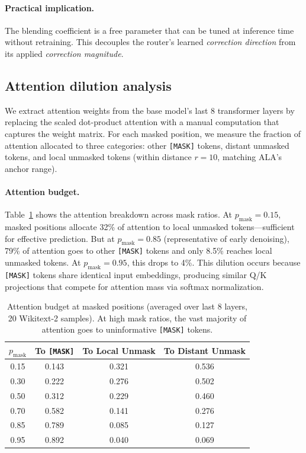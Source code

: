 \documentclass{article} %
\newcommand{\pmask}{p_{\text{mask}}}
\begin{document}
\paragraph{Practical implication.}
The blending coefficient is a free parameter that can be tuned at inference time without retraining.
This decouples the router's learned \emph{correction direction} from its applied \emph{correction magnitude}.

\subsection{Attention dilution analysis}
\label{sec:dilution}

We extract attention weights from the base model's last 8 transformer layers by replacing the scaled dot-product attention with a manual computation that captures the weight matrix.
For each masked position, we measure the fraction of attention allocated to three categories: other \texttt{[MASK]} tokens, distant unmasked tokens, and local unmasked tokens (within distance $r{=}10$, matching ALA's anchor range).

\paragraph{Attention budget.}
Table~\ref{tab:attn_budget} shows the attention breakdown across mask ratios.
At $\pmask{=}0.15$, masked positions allocate 32\% of attention to local unmasked tokens---sufficient for effective prediction.
But at $\pmask{=}0.85$ (representative of early denoising), 79\% of attention goes to other \texttt{[MASK]} tokens and only 8.5\% reaches local unmasked tokens.
At $\pmask{=}0.95$, this drops to 4\%.
This dilution occurs because \texttt{[MASK]} tokens share identical input embeddings, producing similar Q/K projections that compete for attention mass via softmax normalization.

\begin{table}[t]
\begin{center}
\begin{tabular}{cccc}
\toprule
$\pmask$ & To \texttt{[MASK]} & To Local Unmask & To Distant Unmask \\
\midrule
0.15 & 0.143 & 0.321 & 0.536 \\
0.30 & 0.222 & 0.276 & 0.502 \\
0.50 & 0.312 & 0.229 & 0.460 \\
0.70 & 0.582 & 0.141 & 0.276 \\
0.85 & 0.789 & 0.085 & 0.127 \\
0.95 & 0.892 & 0.040 & 0.069 \\
\bottomrule
\end{tabular}
\end{center}
\caption{Attention budget at masked positions (averaged over last 8 layers, 20 Wikitext-2 samples). At high mask ratios, the vast majority of attention goes to uninformative \texttt{[MASK]} tokens.}\label{tab:attn_budget}
\end{table}
\end{document}
